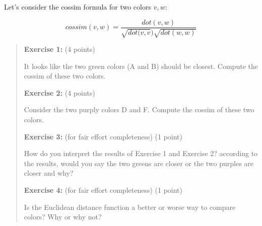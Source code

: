 \documentclass[10pt,letterpaper,unboxed,cm]{article}
\begin{document}
\begin{enumerate}
Let's consider the cossim formula for two colors $v,w$:

$$cossim(v,w) = \frac{dot(v,w)}{\sqrt{dot(v,v})\sqrt{dot(w,w)}}$$
\begin{quote}

{\bf Exercise 1:} (4 points)

It looks like the two green colors (A and B) should be closest. Compute the cossim of these two colors.

{\bf Exercise 2:} (4 points)

Consider the two purply colors D and F. Compute the cossim of these two colors.

{\bf Exercise 3:}  (for fair effort completeness) (1 point)

How do you interpret the results of Exercise 1 and Exercise 2? according to the results, would you say the two greens are closer or the two purples are closer and why?

{\bf Exercise 4:} (for fair effort completeness) (1 point)

Is the Euclidean distance function a better or worse way to compare colors? Why or why not?
\end{quote}



 
\end{enumerate}
\end{document}
